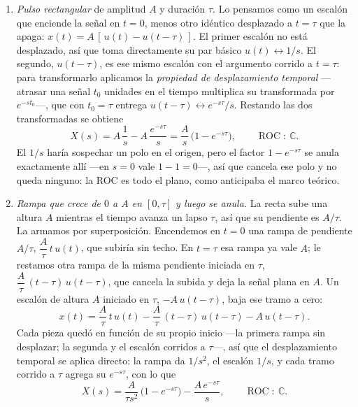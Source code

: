 \documentclass[10pt,a4paper]{article}
\begin{document}
\begin{enumerate}
	\item \emph{Pulso rectangular} de amplitud $A$ y duración $\tau$. Lo pensamos
	como un escalón que enciende la señal en $t=0$, menos otro idéntico
	desplazado a $t=\tau$ que la apaga: $x(t)=A\,[\,u(t)-u(t-\tau)\,]$. El primer
	escalón no está desplazado, así que toma directamente su par básico
	$u(t)\leftrightarrow 1/s$. El segundo, $u(t-\tau)$, es ese mismo escalón con
	el argumento corrido a $t=\tau$: para transformarlo aplicamos la 
	\emph{propiedad de desplazamiento temporal} ---atrasar una señal $t_0$
	unidades en el tiempo multiplica su transformada por $e^{-st_0}$---, que con
	$t_0=\tau$ entrega $u(t-\tau)\leftrightarrow e^{-s\tau}/s$. Restando las dos
	transformadas se obtiene
	\[
		X(s)=A\,\frac{1}{s}-A\,\frac{e^{-s\tau}}{s}=\frac{A}{s}\,\bigl(1-e^{-s\tau}\bigr),
		\qquad \operatorname{ROC}:\ \mathbb{C}.
	\]
	El $1/s$ haría sospechar un polo en el origen, pero el factor $1-e^{-s\tau}$
	se anula exactamente allí ---en $s=0$ vale $1-1=0$---, así que cancela ese
	polo y no queda ninguno: la ROC es todo el plano, como anticipaba el marco
	teórico.

	\item \emph{Rampa que crece de $0$ a $A$ en $[0,\tau]$ y luego se anula.} La
	recta sube una altura $A$ mientras el tiempo avanza un lapso $\tau$, así que su pendiente es $A/\tau$.
	La armamos por superposición. Encendemos en $t=0$ una rampa de pendiente
	$A/\tau$, $\dfrac{A}{\tau}\,t\,u(t)$, que subiría sin techo. En $t=\tau$ esa rampa ya
	vale $A$; le restamos otra rampa de la misma pendiente iniciada en $\tau$,
	$\dfrac{A}{\tau}\,(t-\tau)\,u(t-\tau)$, que cancela la subida y deja la señal plana en
	$A$. Un escalón de altura $A$ iniciado en $\tau$, $-A\,u(t-\tau)$, baja ese tramo
	a cero:
	\[
		x(t)=\frac{A}{\tau}\,t\,u(t)-\frac{A}{\tau}\,(t-\tau)\,u(t-\tau)-A\,u(t-\tau).
	\]
	Cada pieza quedó en función de su propio inicio ---la primera rampa sin
	desplazar; la segunda y el escalón corridos a $\tau$---, así que el
	desplazamiento temporal se aplica directo: la rampa da $1/s^2$, el escalón
	$1/s$, y cada tramo corrido a $\tau$ agrega su $e^{-s\tau}$, con lo que
	\[
		X(s)=\frac{A}{\tau s^2}\,\bigl(1-e^{-s\tau}\bigr)-\frac{A\,e^{-s\tau}}{s},
		\qquad \operatorname{ROC}:\ \mathbb{C}.
	\]


\end{enumerate}
\end{document}
